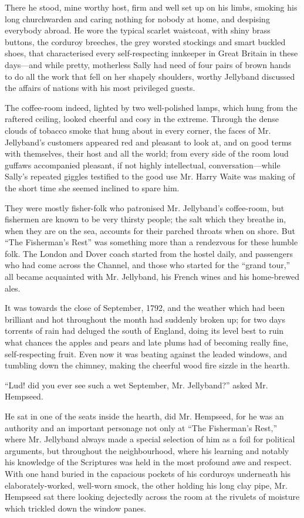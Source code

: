 \documentclass[paper=5.5in:8.5in,BCOR=7mm,twoside,DIV=calc,12pt,usegeometry,chapterprefix,endperiod,headings=big]{scrbook}
\begin{document}
There he stood, mine worthy host, firm and well set up on his limbs, smoking his long churchwarden and caring nothing for nobody at home, and despising everybody abroad. He wore the typical scarlet waistcoat, with shiny brass buttons, the corduroy breeches, the grey worsted stockings and smart buckled shoes, that characterised every self-respecting innkeeper in Great Britain in these days---and while pretty, motherless Sally had need of four pairs of brown hands to do all the work that fell on her shapely shoulders, worthy Jellyband discussed the affairs of nations with his most privileged guests.

The coffee-room indeed, lighted by two well-polished lamps, which hung from the raftered ceiling, looked cheerful and cosy in the extreme. Through the dense clouds of tobacco smoke that hung about in every corner, the faces of Mr. Jellyband's customers appeared red and pleasant to look at, and on good terms with themselves, their host and all the world; from every side of the room loud guffaws accompanied pleasant, if not highly intellectual, conversation---while Sally's repeated giggles testified to the good use Mr. Harry Waite was making of the short time she seemed inclined to spare him.

They were mostly fisher-folk who patronised Mr. Jellyband's coffee-room, but fishermen are known to be very thirsty people; the salt which they breathe in, when they are on the sea, accounts for their parched throats when on shore. But \enquote{The Fisherman's Rest} was something more than a rendezvous for these humble folk. The London and Dover coach started from the hostel daily, and passengers who had come across the Channel, and those who started for the \enquote{grand tour,} all became acquainted with Mr. Jellyband, his French wines and his home-brewed ales.

It was towards the close of September, 1792, and the weather which had been brilliant and hot throughout the month had suddenly broken up; for two days torrents of rain had deluged the south of England, doing its level best to ruin what chances the apples and pears and late plums had of becoming really fine, self-respecting fruit. Even now it was beating against the leaded windows, and tumbling down the chimney, making the cheerful wood fire sizzle in the hearth.

\enquote{Lud! did you ever see such a wet September, Mr. Jellyband?} asked Mr. Hempseed.

He sat in one of the seats inside the hearth, did Mr. Hempseed, for he was an authority and an important personage not only at \enquote{The Fisherman's Rest,} where Mr. Jellyband always made a special selection of him as a foil for political arguments, but throughout the neighbourhood, where his learning and notably his knowledge of the Scriptures was held in the most profound awe and respect. With one hand buried in the capacious pockets of his corduroys underneath his elaborately-worked, well-worn smock, the other holding his long clay pipe, Mr. Hempseed sat there looking dejectedly across the room at the rivulets of moisture which trickled down the window panes.
\end{document}
